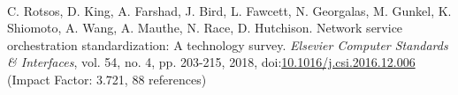 \documentclass[10pt, a4paper]{article}
\newcommand{\DOI}[1]{doi:\href{https://doi.org/#1}{#1}}
\begin{document}
\begin{EntriesList}
     \\
    C. Rotsos, D. King, A. Farshad, J. Bird, L. Fawcett, N. Georgalas, M. Gunkel, K. Shiomoto, A. Wang, A. Mauthe, N. Race, D. Hutchison.
    Network service orchestration standardization: A technology survey.
    \emph{Elsevier Computer Standards \& Interfaces}, vol. 54, no. 4,
pp. 203-215, 2018, \DOI{10.1016/j.csi.2016.12.006} (Impact Factor: 3.721, 88
references) \newline
\end{EntriesList}
\end{document}
